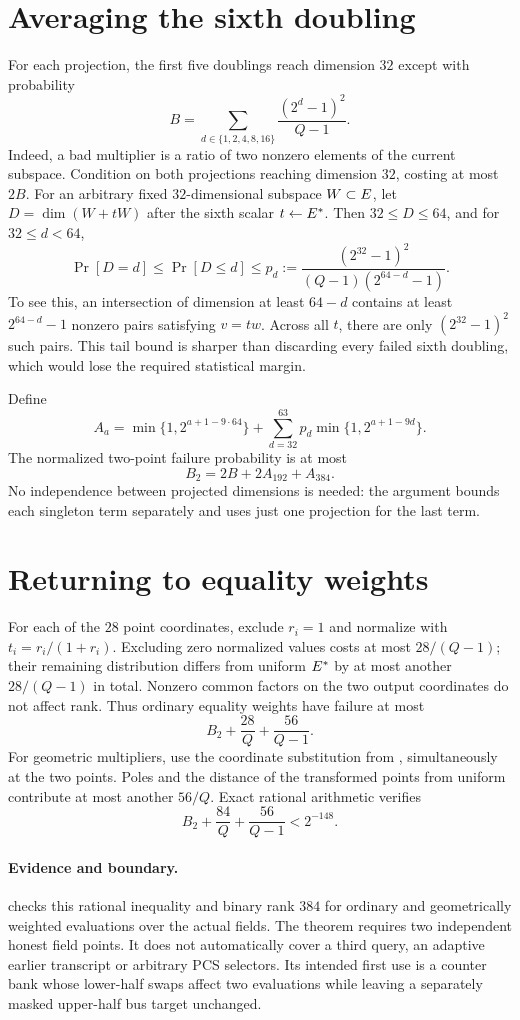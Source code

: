 \documentclass[11pt]{article}
\begin{document}
\section{Averaging the sixth doubling}

For each projection, the first five doublings reach dimension $32$ except with probability
\[
 B=\sum_{d\in\{1,2,4,8,16\}}\frac{(2^d-1)^2}{Q-1}.
\]
Indeed, a bad multiplier is a ratio of two nonzero elements of the current subspace. Condition on both projections reaching dimension $32$, costing at most $2B$. For an arbitrary fixed $32$-dimensional subspace $W\subset E$, let $D=\dim(W+tW)$ after the sixth scalar $t\gets E^*$. Then $32\le D\le64$, and for $32\le d<64$,
\begin{equation}\label{eq:two-dimension-tail}
 \Pr[D=d]\le\Pr[D\le d]
 \le p_d:=\frac{(2^{32}-1)^2}{(Q-1)(2^{64-d}-1)}.
\end{equation}
To see this, an intersection of dimension at least $64-d$ contains at least $2^{64-d}-1$ nonzero pairs satisfying $v=tw$. Across all $t$, there are only $(2^{32}-1)^2$ such pairs. This tail bound is sharper than discarding every failed sixth doubling, which would lose the required statistical margin.

Define
\[
 A_a=\min\{1,2^{a+1-9\cdot64}\}
 +\sum_{d=32}^{63}p_d\min\{1,2^{a+1-9d}\}.
\]
The normalized two-point failure probability is at most
\[
 B_2=2B+2A_{192}+A_{384}.
\]
No independence between projected dimensions is needed: the argument bounds each singleton term separately and uses just one projection for the last term.

\section{Returning to equality weights}

For each of the $28$ point coordinates, exclude $r_i=1$ and normalize with $t_i=r_i/(1+r_i)$. Excluding zero normalized values costs at most $28/(Q-1)$; their remaining distribution differs from uniform $E^*$ by at most another $28/(Q-1)$ in total. Nonzero common factors on the two output coordinates do not affect rank. Thus ordinary equality weights have failure at most
\[
 B_2+\frac{28}{Q}+\frac{56}{Q-1}.
\]
For geometric multipliers, use the coordinate substitution from , simultaneously at the two points. Poles and the distance of the transformed points from uniform contribute at most another $56/Q$. Exact rational arithmetic verifies
\[
 B_2+\frac{84}{Q}+\frac{56}{Q-1}<2^{-148}.
\]

\paragraph{Evidence and boundary.}  checks this rational inequality and binary rank $384$ for ordinary and geometrically weighted evaluations over the actual fields. The theorem requires two independent honest field points. It does not automatically cover a third query, an adaptive earlier transcript or arbitrary PCS selectors. Its intended first use is a counter bank whose lower-half swaps affect two evaluations while leaving a separately masked upper-half bus target unchanged.
\end{document}
